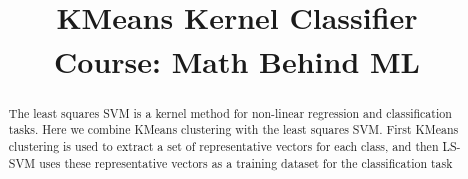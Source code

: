\documentclass[conference]{IEEEtran}
\begin{document}
    \title{KMeans Kernel Classifier\\
    {\footnotesize \textsuperscript {}Course: Math Behind ML }
    }

    \author{
    \and
    }

    \maketitle
    \begin{abstract}
        The least squares SVM is a kernel method for non-linear regression and classification tasks.
        Here we combine KMeans clustering with the least squares SVM. First KMeans clustering is used to extract a set of representative vectors for each class, and then LS-SVM uses these representative vectors as a training dataset for the classification task
    \end{abstract}
\end{document}

